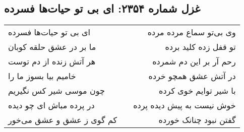\begin{center}
\section*{غزل شماره ۲۳۵۴: ای بی تو حیات‌ها فسرده}
\label{sec:2354}
\begin{longtable}{l p{0.5cm} r}
ای بی تو حیات‌ها فسرده
&&
وی بی‌تو سماع مرده مرده
\\
ما بر در عشق حلقه کوبان
&&
تو قفل زده کلید برده
\\
هر آتش زنده از دم توست
&&
رحم آر بر این دم شمرده
\\
خامیم بیا بسوز ما را
&&
در آتش عشق همچو خرده
\\
چون موسی شیر کس نگیریم
&&
با شیر توایم خوی کرده
\\
در پرده مباش ای چو دیده
&&
خوش نیست به پیش دیده پرده
\\
کم گوی ز عشق و عشق می‌خور
&&
گفتن نبود چنانک خورده
\\
\end{longtable}
\end{center}
